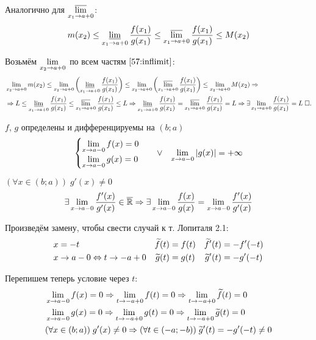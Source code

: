 \documentclass{article}
\begin{document}
\begin{enumerate}
	Аналогично для $\varlimsup\limits_{x_1\to a+0}$:
	\begin{align}
		m(x_2)\leq \varliminf\limits_{x_1\to a+0}\frac{f(x_1)}{g(x_1)}\leq\varlimsup\limits_{x_1\to a+0}\frac{f(x_1)}{g(x_1)}\leq M(x_2)\label{57:inflimit}
	\end{align}

	Возьмём $\lim\limits_{x_2\to a+0}$ по всем частям $\eqref{57:inflimit}$:
	\begin{align*}
		&\lim\limits_{x_2\to a+0}m(x_2)\leq\lim\limits_{x_2\to a+0}\left(\varliminf\limits_{x_1\to a+0}\frac{f(x_1)}{g(x_1)}\right)
		\leq\lim\limits_{x_2\to a+0}\left(\varlimsup\limits_{x_1\to a+0}\frac{f(x_1)}{g(x_1)}\right)\leq \lim\limits_{x_2\to a+0}M(x_2)\Rightarrow\\
		&\Rightarrow L\leq\varliminf\limits_{x_1\to a+0}\frac{f(x_1)}{g(x_1)}\leq\varlimsup\limits_{x_1\to a+0}\frac{f(x_1)}{g(x_1)}\leq L\Rightarrow
		 \varliminf\limits_{x_1\to a+0}\frac{f(x_1)}{g(x_1)}=\varlimsup\limits_{x_1\to a+0}\frac{f(x_1)}{g(x_1)}=L\Rightarrow
		\exists\lim\limits_{x_1\to a+0}\frac{f(x_1)}{g(x_1)}=L\;\square.
	\end{align*}
\end{enumerate}

\pagebreak

\theorem[Лопиталя 2.2]

$f$, $g$ определены и дифференцируемы на $(b;a)$
\begin{align*}
	\begin{cases}
		\lim\limits_{x\to a-0}f(x)=0 \\
		\lim\limits_{x\to a-0}g(x)=0
	\end{cases} &  & \lor &  & \lim\limits_{x\to a-0}|g(x)|=+\infty
\end{align*}

$(\forall x\in(b;a))\;g'(x)\neq 0$
\begin{align*}
	\exists \lim\limits_{x\to a-0}\frac{f'(x)}{g'(x)}\in\overline{\mathbb{R}}\Rightarrow\exists\lim\limits_{x\to a-0}\frac{f(x)}{g(x)}=\lim\limits_{x\to a-0}\frac{f'(x)}{g'(x)}
\end{align*}

\proof

\newcommand\ft{\widetilde{f}}
\newcommand\gt{\widetilde{g}}

Произведём замену, чтобы свести случай к т. Лопиталя 2.1:
\begin{align*}
	 & x=-t                     & \ft(t) & =f(t) & \ft'(t) & =-f'(-t) \\
	 & x\to a-0\Lrarr t\to -a+0 & \gt(t) & =g(t) & \gt'(t) & =-g'(-t)
\end{align*}

Перепишем теперь условие через $t$:
\begin{align*}
	 & \slim{x\to a-0}f(x)=0\Rarr\slim{t\to -a+0}f(t)=0\Rarr\slim{t\to -a+0}\ft(t)=0    \\
	 & \slim{x\to a-0}g(x)=0\Rarr\slim{t\to -a+0}g(t)=0\Rarr\slim{t\to -a+0}\gt(t)=0    \\
	 & (\forall x\in(b;a))\;g'(x)\neq 0\Rarr (\forall t\in(-a;-b))\;\gt'(t)=-g'(-t)\neq 0
\end{align*}
\end{document}
